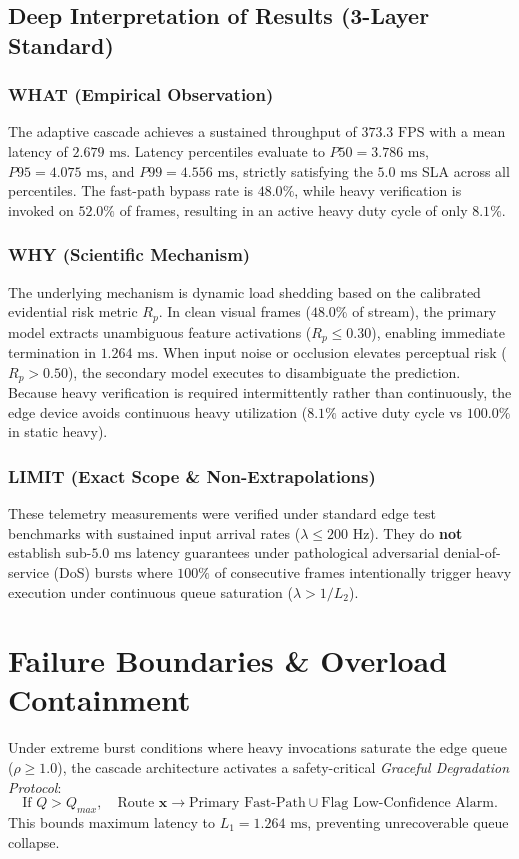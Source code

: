 \documentclass[conference]{IEEEtran}
\begin{document}
\subsection{Deep Interpretation of Results (3-Layer Standard)}
\subsubsection{WHAT (Empirical Observation)}
The adaptive cascade achieves a sustained throughput of $373.3\text{ FPS}$ with a mean latency of $2.679\text{ ms}$. Latency percentiles evaluate to $P50 = 3.786\text{ ms}$, $P95 = 4.075\text{ ms}$, and $P99 = 4.556\text{ ms}$, strictly satisfying the $5.0\text{ ms}$ SLA across all percentiles. The fast-path bypass rate is $48.0\%$, while heavy verification is invoked on $52.0\%$ of frames, resulting in an active heavy duty cycle of only $8.1\%$.

\subsubsection{WHY (Scientific Mechanism)}
The underlying mechanism is dynamic load shedding based on the calibrated evidential risk metric $R_p$. In clean visual frames ($48.0\%$ of stream), the primary model extracts unambiguous feature activations ($R_p \le 0.30$), enabling immediate termination in $1.264\text{ ms}$. When input noise or occlusion elevates perceptual risk ($R_p > 0.50$), the secondary model executes to disambiguate the prediction. Because heavy verification is required intermittently rather than continuously, the edge device avoids continuous heavy utilization ($8.1\%$ active duty cycle vs $100.0\%$ in static heavy).

\subsubsection{LIMIT (Exact Scope \& Non-Extrapolations)}
These telemetry measurements were verified under standard edge test benchmarks with sustained input arrival rates ($\lambda \le 200\text{ Hz}$). They do \textbf{not} establish sub-$5.0\text{ ms}$ latency guarantees under pathological adversarial denial-of-service (DoS) bursts where $100\%$ of consecutive frames intentionally trigger heavy execution under continuous queue saturation ($\lambda > 1/L_2$).

\section{Failure Boundaries \& Overload Containment}
Under extreme burst conditions where heavy invocations saturate the edge queue ($\rho \ge 1.0$), the cascade architecture activates a safety-critical \textit{Graceful Degradation Protocol}:
\begin{equation}
\text{If } Q > Q_{max}, \quad \text{Route } \mathbf{x} \to \text{Primary Fast-Path} \cup \text{Flag Low-Confidence Alarm}.
\end{equation}
This bounds maximum latency to $L_1 = 1.264\text{ ms}$, preventing unrecoverable queue collapse.
\end{document}
